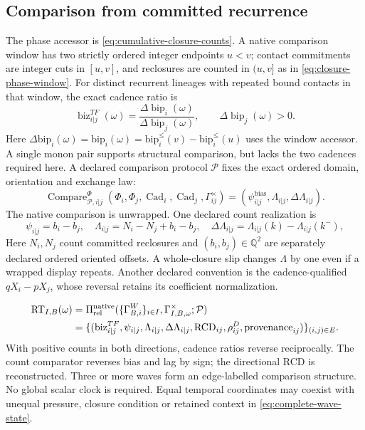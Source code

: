 \subsection{Comparison from committed recurrence}
The phase accessor is \eqref{eq:cumulative-closure-counts}. A native comparison
window has two strictly ordered integer endpoints \(u<v\); contact commitments
are integer cuts in \([u,v]\), and reclosures are counted in \((u,v]\) as in
\eqref{eq:closure-phase-window}. For distinct recurrent lineages with repeated
bound contacts in that window, the exact cadence ratio is
\begin{equation}
\operatorname{biz}^{TF}_{i|j}(\omega)=
\frac{\Delta\operatorname{bip}_i(\omega)}{\Delta\operatorname{bip}_j(\omega)},
\qquad\Delta\operatorname{bip}_j(\omega)>0.
\label{eq:cadence-ratio}
\end{equation}
Here \(\Delta\mathrm{bip}_i(\omega)=\mathrm{bip}_i(\omega)
=\mathrm{bip}^{\le}_i(v)-\mathrm{bip}^{\le}_i(u)\) uses the window accessor.
A single monon pair supports structural comparison, but lacks the two
cadences required here. A declared comparison protocol \(\mathcal P\) fixes
the exact ordered domain, orientation and exchange law:
\begin{equation}
\operatorname{Compare}^{\Phi}_{\mathcal P,i|j}
(\Phi_i,\Phi_j,\operatorname{Cad}_i,\operatorname{Cad}_j,\Gamma^\times_{ij})
=(\psi^{\mathrm{bias}}_{i|j},\Lambda_{i|j},\Delta\Lambda_{i|j}).
\label{eq:native-comparator}
\end{equation}
The native comparison is unwrapped. One declared count realization is
\begin{equation}
\psi_{i|j}=b_i-b_j,\quad
\Lambda_{i|j}=N_i-N_j+b_i-b_j,\quad
\Delta\Lambda_{i|j}=\Lambda_{i|j}(k)-\Lambda_{i|j}(k^-),
\label{eq:count-comparator-realization}
\end{equation}
Here \(N_i,N_j\) count committed reclosures and
\((b_i,b_j)\in\mathbb Q^2\) are separately declared ordered oriented offsets.
A whole-closure slip changes \(\Lambda\) by one even if a wrapped display repeats.
Another declared convention is the cadence-qualified \(qX_i-pX_j\), whose
reversal retains its coefficient normalization.

\begin{equation}
\begin{split}
\operatorname{RT}_{I,B}(\omega)
&=\Pi^{\mathrm{native}}_{\mathrm{rel}}
(\{\Gamma^W_{B,i}\}_{i\in I},\Gamma^\times_{I,B,\omega};\mathcal P)\\
&=\{(\operatorname{biz}^{TF}_{i|j},\psi_{i|j},\Lambda_{i|j},
\Delta\Lambda_{i|j},\mathrm{RCD}_{ij},\rho^D_{ij},\mathrm{provenance}_{ij})\}_{(i,j)\in E}.
\end{split}
\label{eq:relational-time}
\end{equation}
With positive counts in both directions, cadence ratios reverse reciprocally.
The count comparator reverses bias and lag by sign; the directional RCD is
reconstructed. Three or more waves form an edge-labelled comparison structure.
No global scalar clock is required. Equal temporal coordinates may coexist
with unequal pressure, closure condition or retained context in
\eqref{eq:complete-wave-state}.

